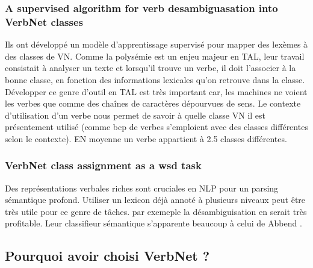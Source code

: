 \subsubsection{A supervised algorithm for verb desambiguasation into VerbNet classes}
\citep{AbendSupervisedAlgorithmVerb2008}
Ils ont développé un modèle d'apprentissage supervisé pour mapper des lexèmes à des classes de VN. Comme la polysémie est un enjeu majeur en TAL, leur travail consistait à analyser un texte et lorsqu'il trouve un verbe, il doit l'associer à la bonne classe, en fonction des informations lexicales qu'on retrouve dans la classe. Développer ce genre d'outil en TAL est très important car, les machines ne voient les verbes que comme des chaînes de caractères dépourvues de sens. Le contexte d'utilisation d'un verbe nous permet de savoir à quelle classe VN il est présentement utilisé (comme bcp de verbes s'emploient avec des classes différentes selon le contexte). EN moyenne un verbe appartient à 2.5 classes différentes.

\subsubsection{VerbNet class assignment as a wsd task}
\citep{BrownVerbNetClassAssignment2011}
Des représentations verbales riches sont cruciales en NLP pour un parsing sémantique profond. Utiliser un lexicon déjà annoté à plusieurs niveaux peut être très utile pour ce genre de tâches. par exemeple la désambiguisation en serait très profitable. Leur classifieur sémantique s'apparente beaucoup à celui de Abbend \citep{AbendSupervisedAlgorithmVerb2008}.

\subsection{Pourquoi avoir choisi VerbNet ?}

